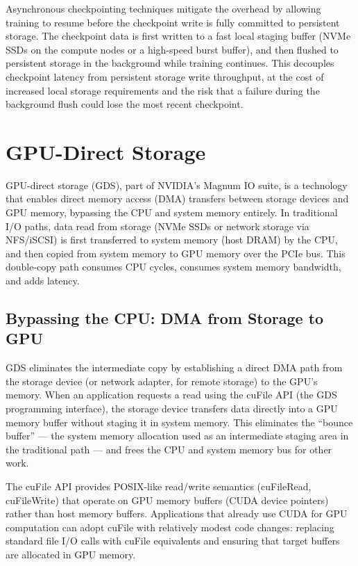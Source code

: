 Asynchronous checkpointing techniques mitigate the overhead by allowing training to resume before the checkpoint write is fully committed to persistent storage. The checkpoint data is first written to a fast local staging buffer (NVMe SSDs on the compute nodes or a high-speed burst buffer), and then flushed to persistent storage in the background while training continues. This decouples checkpoint latency from persistent storage write throughput, at the cost of increased local storage requirements and the risk that a failure during the background flush could lose the most recent checkpoint.

\section{GPU-Direct Storage}

GPU-direct storage (GDS), part of NVIDIA's Magnum IO suite, is a technology that enables direct memory access (DMA) transfers between storage devices and GPU memory, bypassing the CPU and system memory entirely. In traditional I/O paths, data read from storage (NVMe SSDs or network storage via NFS/iSCSI) is first transferred to system memory (host DRAM) by the CPU, and then copied from system memory to GPU memory over the PCIe bus. This double-copy path consumes CPU cycles, consumes system memory bandwidth, and adds latency.

\subsection{Bypassing the CPU: DMA from Storage to GPU}

GDS eliminates the intermediate copy by establishing a direct DMA path from the storage device (or network adapter, for remote storage) to the GPU's memory. When an application requests a read using the cuFile API (the GDS programming interface), the storage device transfers data directly into a GPU memory buffer without staging it in system memory. This eliminates the ``bounce buffer'' --- the system memory allocation used as an intermediate staging area in the traditional path --- and frees the CPU and system memory bus for other work.

The cuFile API provides POSIX-like read/write semantics (cuFileRead, cuFileWrite) that operate on GPU memory buffers (CUDA device pointers) rather than host memory buffers. Applications that already use CUDA for GPU computation can adopt cuFile with relatively modest code changes: replacing standard file I/O calls with cuFile equivalents and ensuring that target buffers are allocated in GPU memory.

